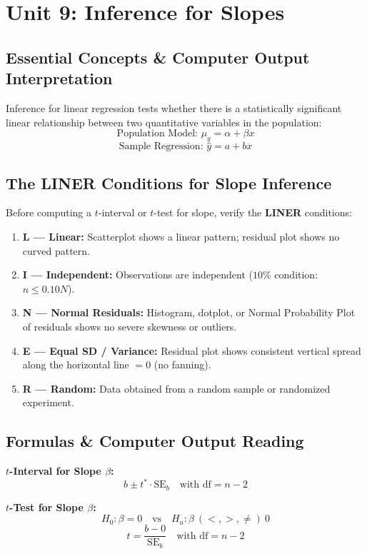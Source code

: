 \chapter{Unit 9: Inference for Slopes}

\section{Essential Concepts \& Computer Output Interpretation}

Inference for linear regression tests whether there is a statistically significant linear relationship between two quantitative variables in the population:
\[
\text{Population Model: } \mu_y = \alpha + \beta x
\]
\[
\text{Sample Regression: } \hat{y} = a + bx
\]

\section{The LINER Conditions for Slope Inference}

Before computing a $t$-interval or $t$-test for slope, verify the \textbf{LINER} conditions:
\begin{enumerate}
    \item \textbf{L --- Linear:} Scatterplot shows a linear pattern; residual plot shows no curved pattern.
    \item \textbf{I --- Independent:} Observations are independent ($10\%$ condition: $n \le 0.10N$).
    \item \textbf{N --- Normal Residuals:} Histogram, dotplot, or Normal Probability Plot of residuals shows no severe skewness or outliers.
    \item \textbf{E --- Equal SD / Variance:} Residual plot shows consistent vertical spread along the horizontal line $= 0$ (no fanning).
    \item \textbf{R --- Random:} Data obtained from a random sample or randomized experiment.
\end{enumerate}

\section{Formulas \& Computer Output Reading}

\begin{formulabox}
\textbf{$t$-Interval for Slope $\beta$:}
\[
b \pm t^* \cdot \text{SE}_b \quad \text{with } \text{df} = n - 2
\]

\textbf{$t$-Test for Slope $\beta$:}
\[
H_0: \beta = 0 \quad \text{vs} \quad H_a: \beta \ (<, >, \ne) \ 0
\]
\[
t = \frac{b - 0}{\text{SE}_b} \quad \text{with } \text{df} = n - 2
\]
\end{formulabox}

